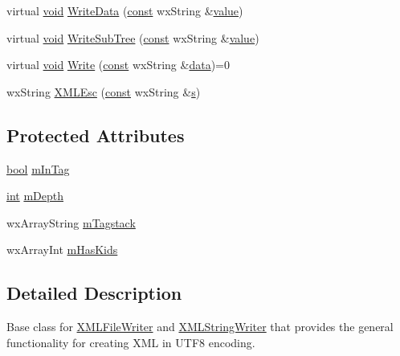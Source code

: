 \begin{DoxyCompactItemize}
\item 
virtual \hyperlink{sound_8c_ae35f5844602719cf66324f4de2a658b3}{void} \hyperlink{class_x_m_l_writer_a2135cd561de524f5bcf2056fa92f924a}{Write\+Data} (\hyperlink{getopt1_8c_a2c212835823e3c54a8ab6d95c652660e}{const} wx\+String \&\hyperlink{lib_2expat_8h_a4a30a13b813682e68c5b689b45c65971}{value})
\item 
virtual \hyperlink{sound_8c_ae35f5844602719cf66324f4de2a658b3}{void} \hyperlink{class_x_m_l_writer_af218028d6630f6ddf5e5fe400e21e79f}{Write\+Sub\+Tree} (\hyperlink{getopt1_8c_a2c212835823e3c54a8ab6d95c652660e}{const} wx\+String \&\hyperlink{lib_2expat_8h_a4a30a13b813682e68c5b689b45c65971}{value})
\item 
virtual \hyperlink{sound_8c_ae35f5844602719cf66324f4de2a658b3}{void} \hyperlink{class_x_m_l_writer_acf34179e0c03b74e5c694d882b7e503c}{Write} (\hyperlink{getopt1_8c_a2c212835823e3c54a8ab6d95c652660e}{const} wx\+String \&\hyperlink{lib_2expat_8h_ac39e72a1de1cb50dbdc54b08d0432a24}{data})=0
\item 
wx\+String \hyperlink{class_x_m_l_writer_a39d79a81d3d98ff51ec42d60ea5ef84e}{X\+M\+L\+Esc} (\hyperlink{getopt1_8c_a2c212835823e3c54a8ab6d95c652660e}{const} wx\+String \&\hyperlink{lib_2expat_8h_a755339d27872b13735c2cab829e47157}{s})
\end{DoxyCompactItemize}
\subsection*{Protected Attributes}
\begin{DoxyCompactItemize}
\item 
\hyperlink{mac_2config_2i386_2lib-src_2libsoxr_2soxr-config_8h_abb452686968e48b67397da5f97445f5b}{bool} \hyperlink{class_x_m_l_writer_a8d64add3e4fd4beaf05f74639db74912}{m\+In\+Tag}
\item 
\hyperlink{xmltok_8h_a5a0d4a5641ce434f1d23533f2b2e6653}{int} \hyperlink{class_x_m_l_writer_ad856a7bd4578bc0ad2dc533d978f2302}{m\+Depth}
\item 
wx\+Array\+String \hyperlink{class_x_m_l_writer_a7ba27fdff6fa64219819244a652150dc}{m\+Tagstack}
\item 
wx\+Array\+Int \hyperlink{class_x_m_l_writer_ab2634ace3a8d33c9133be6dcdc5fede1}{m\+Has\+Kids}
\end{DoxyCompactItemize}


\subsection{Detailed Description}
Base class for \hyperlink{class_x_m_l_file_writer}{X\+M\+L\+File\+Writer} and \hyperlink{class_x_m_l_string_writer}{X\+M\+L\+String\+Writer} that provides the general functionality for creating X\+ML in U\+T\+F8 encoding. 

